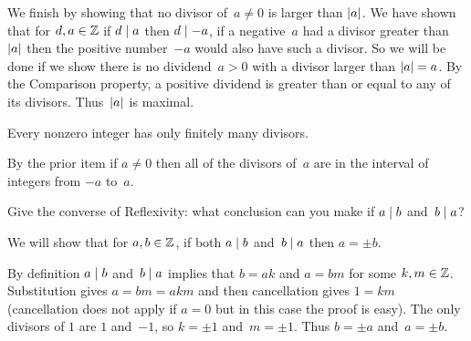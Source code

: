 \documentclass{ibl}  %
\begin{document}
\begin{problem}
\begin{exes}
\begin{answer}
  We finish by showing that no divisor of~$a\neq 0$ is larger than $\lvert a\rvert$.
  We have shown that for $d,a\in\mathbb{Z}$ if $d\mid a$ then $d\mid -a$,
  if a negative~$a$ had a divisor greater than~$\lvert a\rvert$ then the
  positive number~$-a$ would also have such a divisor.
  So we will be done if
  we show there is no dividend~$a>0$ with a divisor larger than $\lvert a\rvert=a$.
  By the Comparison property, a positive dividend is greater than or 
  equal to any of its divisors. 
  Thus~$\lvert a\rvert$ is maximal.
\end{answer}
\begin{exercise}
  Every nonzero integer has only finitely many divisors.
\end{exercise}
\begin{answer}
  By the prior item if $a\neq 0$ then all of the divisors of~$a$
  are in the interval of integers from $-a$ to~$a$. 
\end{answer}
\end{exes}
\end{problem}

\begin{problem}
Give the converse of Reflexivity: what conclusion can you make
if $a\mid b$ and~$b\mid a$?
\begin{answer}
We will show that for $a,b\in\mathbb{Z}$, if both $a\mid b$ and~$b\mid a$
then $a=\pm b$.

By definition $a\mid b$ and~$b\mid a$ implies that $b=ak$
and $a=bm$ for some $k,m\in\mathbb{Z}$.
Substitution gives $a=bm=akm$ and then cancellation gives $1=km$ (cancellation
does not apply if $a=0$ but in this case the proof is easy).
The only divisors of $1$ are $1$ and~$-1$, so $k=\pm 1$ and~$m=\pm 1$. 
Thus $b=\pm a$ and~$a=\pm b$.
\end{answer}
\end{problem}
\end{document}
